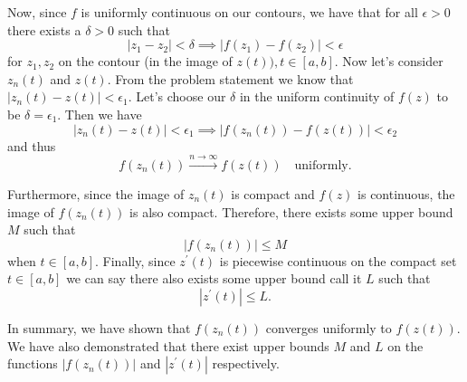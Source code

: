 \documentclass[10pt]{amsart}
\theoremstyle{nonumberplain}
\begin{document}
\begin{enumerate}[label={\bf {\arabic*}:}]
\noindent
Now, since $f$ is uniformly continuous on our contours, we have that for all $\epsilon > 0$ there exists a $\delta > 0$ such that
$$
\left| z_1 - z_2 \right| < \delta \implies \left| f(z_1) - f(z_2) \right| < \epsilon
$$
for $z_1, z_2$ on the contour (in the image of $z(t)), t \in [a, b]$.
Now let's consider $z_n(t)$ and $z(t)$.
From the problem statement we know that $| z_n(t) - z(t) | < \epsilon_1$. Let's choose our $\delta$ in the uniform continuity of $f(z)$ to be $\delta = \epsilon_1$. Then we have
$$| z_n(t) - z(t) | < \epsilon_1 \implies | f(z_n(t)) - f(z(t)) | < \epsilon_2$$
and thus $$f(z_n(t)) \overset{n \to \infty}{\longrightarrow} f(z(t)) \quad \text{uniformly}.$$

\noindent
Furthermore, since the image of $z_n(t)$ is compact and $f(z)$ is continuous, the image of $f(z_n(t))$ is also compact.
Therefore, there exists some upper bound $M$ such that
$$|f(z_n(t))| \leq M$$
when $t \in [a, b]$. 
Finally, since $z^\prime(t)$ is piecewise continuous on the compact set $t \in [a, b]$ we can say there also exists some upper bound call it $L$ such that 
$$|z^\prime(t)| \leq L.$$

\noindent
In summary, we have shown that $f(z_n(t))$ converges uniformly to $f(z(t))$.
We have also demonstrated that there exist upper bounds $M$ and $L$ on the functions $|f(z_n(t))|$ and $|z^\prime(t)|$ respectively. \\


\end{enumerate}
\end{document}
